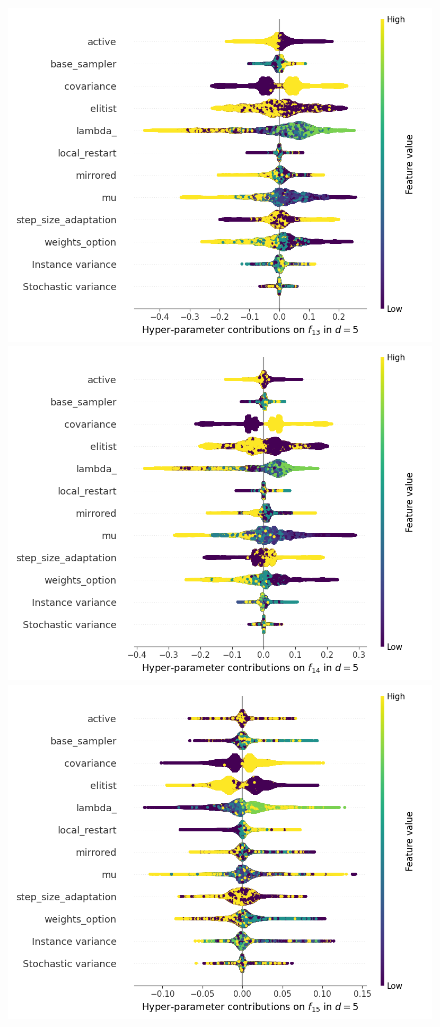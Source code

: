 \begin{figure}[t]
	\includegraphics[height=0.15\textheight,trim=0mm 0mm 30mm 0mm,clip]{cma_img_new/img_summary_f13_d5.png}
	\includegraphics[height=0.15\textheight,trim=60mm 0mm 30mm 0mm,clip]{cma_img_new/img_summary_f14_d5.png}
	\includegraphics[height=0.15\textheight,trim=60mm 0mm 30mm 0mm,clip]{cma_img_new/img_summary_f15_d5.png}

\end{figure}
